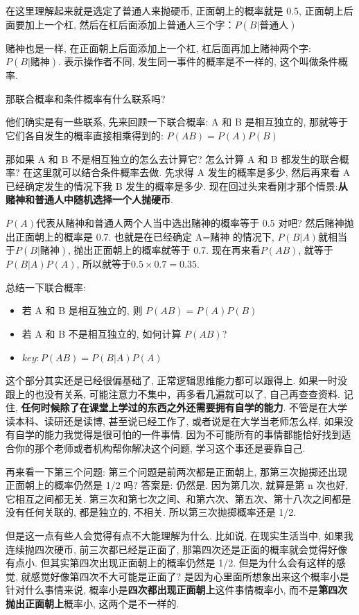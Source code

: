 在这里理解起来就是选定了普通人来抛硬币, 正面朝上的概率就是 0.5, 正面朝上后面要加上一个杠, 然后在杠后面添加上普通人三个字：$P(B|\mbox{普通人})$

赌神也是一样, 在正面朝上后面添加上一个杠, 杠后面再加上赌神两个字: $P(B|\mbox{赌神})$.  表示操作者不同, 发生同一事件的概率是不一样的, 这个叫做条件概率. 

那联合概率和条件概率有什么联系吗? 

他们确实是有一些联系, 先来回顾一下联合概率: A 和 B 是相互独立的, 那就等于它们各自发生的概率直接相乘得到的: $P(AB) = P(A)P(B)$

那如果 A 和 B 不是相互独立的怎么去计算它? 怎么计算 A 和 B 都发生的联合概率? 在这里就可以结合条件概率去做. 先求得 A 发生的概率是多少, 然后再来看 A 已经确定发生的情况下我 B 发生的概率是多少. 现在回过头来看刚才那个情景:\textbf{从赌神和普通人中随机选择一个人抛硬币}. 

$P(A)$代表从赌神和普通人两个人当中选出赌神的概率等于 0.5 对吧? 然后赌神抛出正面朝上的概率是 0.7.  也就是在已经确定 A=赌神 的情况下, $P(B|A)$就相当于$P(B|\mbox{赌神})$, 抛出正面朝上的概率就等于 0.7. 现在再来看$P(AB)$, 就等于$P(B|A)P(A)$, 所以就等于$0.5 \times 0.7=0.35$. 

总结一下联合概率:
\begin{itemize}
  \item 若 A 和 B 是相互独立的, 则 $P(AB) = P(A)P(B)$ 
  \item 若 A 和 B 不是相互独立的, 如何计算 $P(AB)$? 
  \item $key: P(AB) = P(B|A)P(A)$
\end{itemize}

这个部分其实还是已经很偏基础了, 正常逻辑思维能力都可以跟得上. 如果一时没跟上的也没有关系, 可能注意力不集中，再多看几遍就可以了, 自己再查查资料. 记住, \textbf{任何时候除了在课堂上学过的东西之外还需要拥有自学的能力}. 不管是在大学读本科、读研还是读博, 甚至说已经工作了, 或者说是在大学当老师怎么样, 如果没有自学的能力我觉得是很可怕的一件事情. 因为不可能所有的事情都能恰好找到适合你的那个老师或者机构帮你解决这个问题, 学习这个事还是要靠自己. 

再来看一下第三个问题: 第三个问题是前两次都是正面朝上, 那第三次抛掷还出现正面朝上的概率仍然是 1/2 吗? 答案是: 仍然是. 因为第几次, 就算是第 n 次也好, 它相互之间都无关. 第三次和第七次之间、和第六次、第五次、第十八次之间都是没有任何关联的, 都是独立的, 不相关. 所以第三次抛掷概率还是 1/2. 

但是这一点有些人会觉得有点不大能理解为什么. 比如说, 在现实生活当中, 如果我连续抛四次硬币, 前三次都已经是正面了, 那第四次还是正面的概率就会觉得好像有点小. 但其实第四次出现正面朝上的概率仍然是 1/2. 但是为什么会有这样的感觉, 就感觉好像第四次不大可能是正面了? 是因为心里面所想象出来这个概率小是针对什么事情来说, 概率小是\textbf{四次都出现正面朝上}这件事情概率小, 而不是\textbf{第四次抛出正面朝上}概率小, 这两个是不一样的. 

